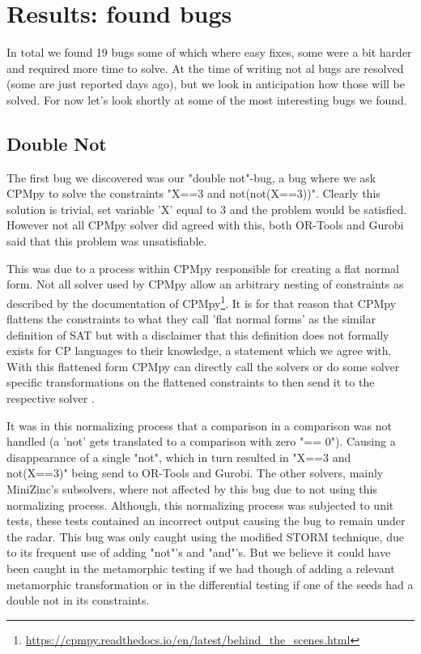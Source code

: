 \section{Results: found bugs}
\label{results:bugs}
In total we found 19 bugs some of which where easy fixes, some were a bit harder and required more time to solve. At the time of writing not al bugs are resolved (some are just reported days ago), but we look in anticipation how those will be solved. For now let's look shortly at some of the most interesting bugs we found.

\subsection{Double Not}
\label{result:bug:DoubleNot}
The first bug we discovered was our "double not"-bug, a bug where we ask CPMpy to solve the constraints "X==3 and not(not(X==3))". Clearly this solution is trivial, set variable 'X' equal to 3 and the problem would be satisfied. However not all CPMpy solver did agreed with this, both OR-Tools and Gurobi said that this problem was unsatisfiable. 

This was due to a process within CPMpy responsible for creating a flat normal form. Not all solver used by CPMpy allow an arbitrary nesting of constraints as described by the documentation of CPMpy\footnote{\url{https://cpmpy.readthedocs.io/en/latest/behind_the_scenes.html}}. It is for that reason that CPMpy flattens the constraints to what they call 'flat normal forms' as the similar definition of SAT but with a disclaimer that this definition does not formally exists for CP languages to their knowledge, a statement which we agree with. With this flattened form CPMpy can directly call the solvers or do some solver specific transformations on the flattened constraints to then send it to the respective solver \cite{CPMpyGithub}. 

It was in this normalizing process that a comparison in a comparison was not handled (a 'not' gets translated to a comparison with zero "== 0"). Causing a disappearance of a single "not", which in turn resulted in "X==3 and not(X==3)" being send to OR-Tools and Gurobi. The other solvers, mainly MiniZinc's subsolvers, where not affected by this bug due to not using this normalizing process. Although, this normalizing process was subjected to unit tests, these tests contained an incorrect output causing the bug to remain under the radar. This bug was only caught using the modified STORM technique, due to its frequent use of adding "not"'s and "and"'s. But we believe it could have been caught in the metamorphic testing if we had though of adding a relevant metamorphic transformation or in the differential testing if one of the seeds had a double not in its constraints.

